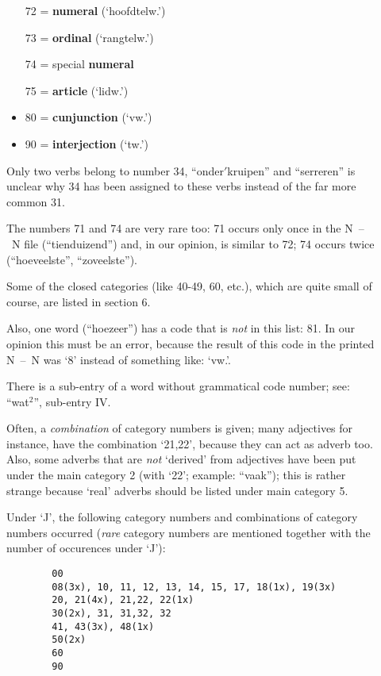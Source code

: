 \begin{description}
\begin{itemize}
72 = {\bf numeral} (`hoofdtelw.')

73 = {\bf ordinal} (`rangtelw.')

74 = special {\bf numeral}

75 = {\bf article} (`lidw.')

        \item 80 = {\bf cunjunction} (`vw.')
        \item 90 = {\bf interjection} (`tw.')
   \end{itemize}

        Only two verbs belong to number 34, ``onder$'$kruipen'' and 
        ``serreren''
        is unclear why 34 has been assigned to these verbs instead of the far
        more common 31.

        The numbers 71 and 74 are very rare too: 71 occurs only once in the 
        N~--~N file (``tienduizend'') and, in our opinion, is similar to 72; 74
        occurs twice (``hoeveelste'', ``zoveelste'').

        Some of the closed categories (like 40-49, 60, etc.), which are quite 
        small of course,  are listed in section 6.

        Also, one word (``hoezeer'') has a code that is {\em not} in this list: 
        81. In our opinion this must be an error, because the result of this code
        in the printed N~--~N was `8' instead of something like: `vw.'.

        There is a sub-entry of a word without grammatical code number; see:
        ``wat$^{2}$'', sub-entry IV.

        Often, a {\em combination} of category numbers is given; many adjectives
        for instance, have the combination `21,22', because they can act as
        adverb too. Also, some adverbs that are {\em not} `derived' from 
        adjectives have been put under the main category 2 (with `22'; example:
        ``vaak''); this is
        rather strange because `real' adverbs should be listed under main  
        category 5.

        Under `J', the following category numbers and combinations of category
        numbers occurred ({\em rare} category numbers are mentioned together 
        with the number of occurences under `J'):

\begin{verbatim}
        00
        08(3x), 10, 11, 12, 13, 14, 15, 17, 18(1x), 19(3x)
        20, 21(4x), 21,22, 22(1x)
        30(2x), 31, 31,32, 32
        41, 43(3x), 48(1x)
        50(2x)
        60
        90
\end{verbatim}


\end{description}
